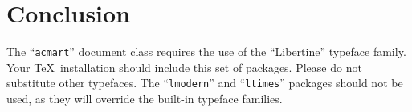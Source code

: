 
\section{Conclusion} \label{sec:conclusion}

The ``\verb|acmart|'' document class requires the use of the
``Libertine'' typeface family. Your \TeX\ installation should include
this set of packages. Please do not substitute other typefaces. The
``\verb|lmodern|'' and ``\verb|ltimes|'' packages should not be used,
as they will override the built-in typeface families.